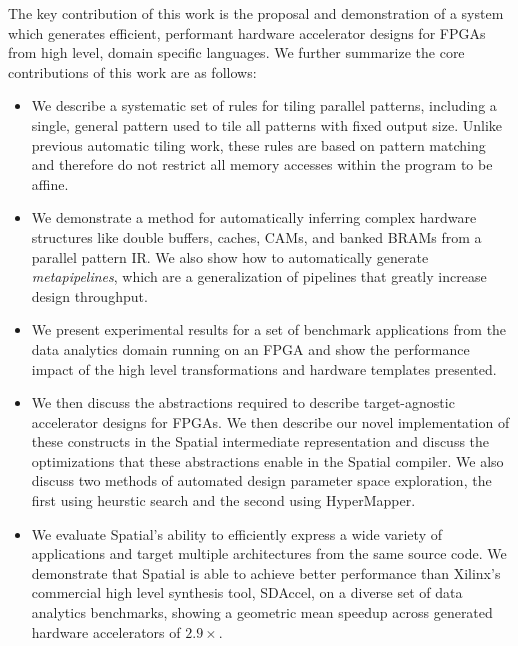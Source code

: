 The key contribution of this work is the proposal and demonstration of a system
which generates efficient, performant hardware accelerator designs
for FPGAs from high level, domain specific languages.
We further summarize the core contributions of this work are as follows:
\vspace{-5pt}
\begin{itemize}
  \item We describe a systematic set of rules for tiling parallel patterns,
  including a single, general pattern used to tile all patterns with fixed output size.
  Unlike previous automatic tiling work, these rules are based on pattern matching
  and therefore do not restrict all memory accesses within the program to be affine.

  \vspace{5pt}

  \item We demonstrate a method for automatically inferring complex hardware
  structures like double buffers, caches, CAMs, and banked BRAMs from a parallel pattern IR.
  We also show how to automatically generate \emph{metapipelines}, which are a
  generalization of pipelines that greatly increase design throughput.

  \vspace{5pt}

  \item We present experimental results for a set of benchmark applications
  from the data analytics domain running on an FPGA and show the performance impact of
  the high level transformations and hardware templates presented.

  \vspace{5pt}

  \item We then discuss the abstractions required to describe target-agnostic accelerator designs for FPGAs.
  We then describe our novel implementation of these constructs in the Spatial intermediate representation
  and discuss the optimizations that these abstractions enable in the Spatial compiler.
  We also discuss two methods of automated design parameter space exploration,
  the first using heurstic search and the second using HyperMapper.

  \vspace{5pt}

  \item We evaluate Spatial's ability to efficiently express a wide variety of applications and
    target multiple architectures from the same source code.
    We demonstrate that Spatial is able to achieve better performance than Xilinx's commercial high level synthesis tool, SDAccel,
    on a diverse set of data analytics benchmarks, showing a geometric mean speedup across generated hardware accelerators of $2.9\times$.
\end{itemize}


